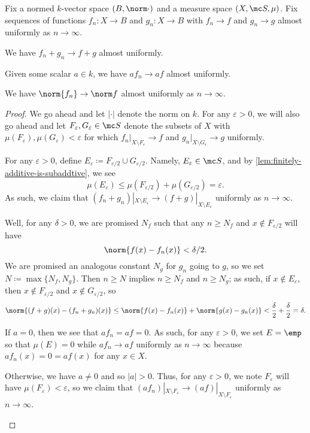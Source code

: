 \documentclass[../notes.tex]{subfiles}
\begin{document}
\begin{lemma}
	Fix a normed $k$-vector space $(B,\norm\cdot)$ and a measure space $(X,\mc S,\mu)$. Fix sequences of functions $f_n\colon X\to B$ and $g_n\colon X\to B$ with $f_n\to f$ and $g_n\to g$ almost uniformly as $n\to\infty$.
	\begin{listalph}
		\item We have $f_n+g_n\to f+g$ almost uniformly.
		\item Given some scalar $a\in k$, we have $af_n\to af$ almost uniformly.
		\item We have $\norm{f_n}\to\norm f$ almost uniformly as $n\to\infty$.
	\end{listalph}
\end{lemma}
\begin{proof}
	We go ahead and let $|\cdot|$ denote the norm on $k$. For any $\varepsilon>0$, we will also go ahead and let $F_\varepsilon,G_\varepsilon\in\mc S$ denote the subsets of $X$ with $\mu(F_\varepsilon),\mu(G_\varepsilon)<\varepsilon$ for which $f_n|_{X\setminus F_\varepsilon}\to f$ and $g_n|_{X\setminus G_\varepsilon}\to g$ uniformly.
	\begin{listalph}
		\item For any $\varepsilon>0$, define $E_\varepsilon\coloneqq F_{\varepsilon/2}\cup G_{\varepsilon/2}$. Namely, $E_\varepsilon\in\mc S$, and by \autoref{lem:finitely-additive-is-subaddtive}, we see
		\[\mu(E_\varepsilon)\le\mu(F_{\varepsilon/2})+\mu(G_{\varepsilon/2})=\varepsilon.\]
		As such, we claim that $(f_n+g_n)|_{X\setminus E_\varepsilon}\to(f+g)|_{X\setminus E_\varepsilon}$ uniformly as $n\to\infty$.

		Well, for any $\delta>0$, we are promised $N_f$ such that any $n\ge N_f$ and $x\notin F_{\varepsilon/2}$ will have
		\[\norm{f(x)-f_n(x)}<\delta/2.\]
		We are promised an analogous constant $N_g$ for $g_n$ going to $g$, so we set $N\coloneqq\max\{N_f,N_g\}$. Then $n\ge N$ implies $n\ge N_f$ and $n\ge N_g$; as such, if $x\notin E_\varepsilon$, then $x\notin F_{\varepsilon/2}$ and $x\notin G_{\varepsilon/2}$, so
		\[\norm{(f+g)(x)-(f_n+g_n)(x)}\le\norm{f(x)-f_n(x)}+\norm{g(x)-g_n(x)}<\frac\delta2+\frac\delta2=\delta.\]

		\item If $a=0$, then we see that $af_n=af=0$. As such, for any $\varepsilon>0$, we set $E=\emp$ so that $\mu(E)=0$ while $af_n\to af$ uniformly as $n\to\infty$ because $af_n(x)=0=af(x)$ for any $x\in X$.

		Otherwise, we have $a\ne0$ and so $|a|>0$. Thus, for any $\varepsilon>0$, we note $F_\varepsilon$ will have $\mu(F_\varepsilon)<\varepsilon$, so we claim that $(af_n)|_{X\setminus F_\varepsilon}\to(af)|_{X\setminus F_\varepsilon}$ uniformly as $n\to\infty$.


\end{listalph}
\end{proof}
\end{document}
